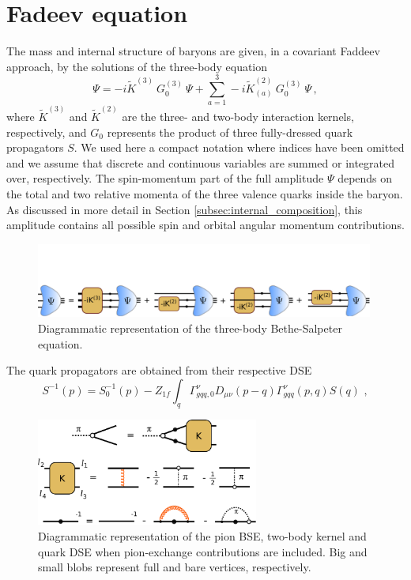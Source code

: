 \section{Fadeev equation}
\label{sec:framework}
The mass and internal structure of baryons are given, in a covariant
Faddeev approach, by the solutions of the three-body equation
\begin{equation}\label{eq:3bBSEcompact}
\Psi = -i\widetilde{K}^{(3)}~G_0^{(3)}~\Psi + \sum_{a=1}^3 -i\widetilde{K}_{(a)}^{(2)}~G_0^{(3)}~\Psi\,,
\end{equation}
where $\widetilde{K}^{(3)}$ and $\widetilde{K}^{(2)}$ are the three- and two-body interaction kernels, respectively, and $G_0$ represents the product of three fully-dressed quark propagators $S$. We used here a compact notation where indices have been omitted and we assume that discrete and continuous variables are summed or integrated over, respectively. 
The spin-momentum part of the full amplitude $\Psi$ depends on 
the total and two relative momenta of the three valence quarks inside 
the baryon. As discussed in more detail in Section \ref{subsec:internal_composition}, 
this amplitude contains all possible spin and orbital angular momentum contributions.
\begin{figure}[h]
 \begin{center}
  \includegraphics[width=0.99\textwidth]{figures/full_BSE}
 \end{center}
 \caption{Diagrammatic representation of the three-body Bethe-Salpeter equation.}\label{fig:faddeev_eq}
\end{figure}
The quark propagators are obtained from their respective DSE
\begin{equation}\label{eq:quarkDSE}
 S^{-1}(p)=S^{-1}_0(p)-Z_{1f}\int_q \Gamma^\nu_{gqq,0}
D_{\mu\nu}(p-q)\Gamma^\nu_{gqq}(p,q)S(q)\,\,,
\end{equation}
\begin{figure}[h]
 \begin{center}
  \includegraphics[width=0.65\textwidth]{figures/system_with_pion}
 \end{center}
 \caption{Diagrammatic representation of the pion BSE, two-body kernel and quark DSE when pion-exchange contributions are included. Big and small blobs represent full and bare vertices, respectively.}\label{fig:system_with_pion}
\end{figure}
